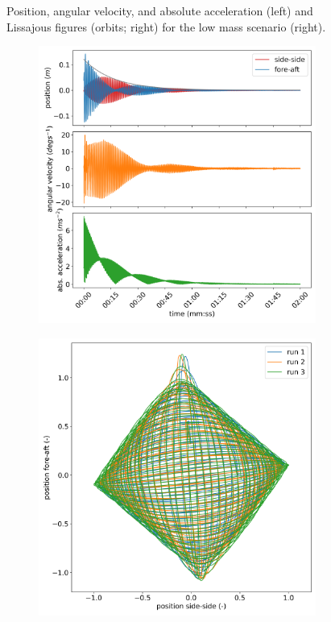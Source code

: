 \documentclass{article}
\begin{document}
\begin{figure}[ht!]
    \caption{Position, angular velocity, and absolute acceleration (left) and Lissajous figures (orbits; right) for the low mass scenario (right).}
    \label{fig:low-mass}
\end{figure}


\begin{figure}

    \centering
    \begin{subfigure}[b]{0.45\textwidth}
        \centering
        \includegraphics[width=\textwidth]{figures/medium_mass_acceleration.png}
    \end{subfigure}
    \begin{subfigure}[b]{0.45\textwidth}
        \centering
        \includegraphics[width=\textwidth]{figures/medium_mass_orbit.png}

\end{subfigure}
\end{figure}
\end{document}
